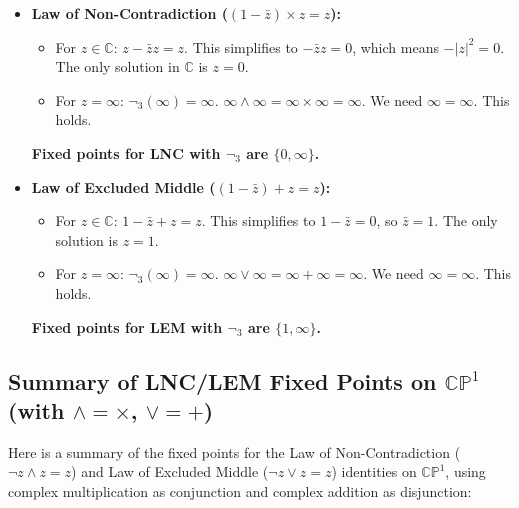 	\begin{itemize}
		\item \textbf{Law of Non-Contradiction ($(1 - \bar{z}) \times z = z$):}
		\begin{itemize}
			\item For $z \in \mathbb{C}$: $z - \bar{z}z = z$. This simplifies to $-\bar{z}z = 0$, which means $-|z|^2 = 0$. The only solution in $\mathbb{C}$ is $z = 0$.
			\item For $z = \infty$: $\neg_3(\infty) = \infty$. $\infty \wedge \infty = \infty \times \infty = \infty$. We need $\infty = \infty$. This holds.
		\end{itemize}
		\textbf{Fixed points for LNC with $\neg_3$ are $\{0, \infty\}$.}
		
		\item \textbf{Law of Excluded Middle ($(1 - \bar{z}) + z = z$):}
		\begin{itemize}
			\item For $z \in \mathbb{C}$: $1 - \bar{z} + z = z$. This simplifies to $1 - \bar{z} = 0$, so $\bar{z} = 1$. The only solution is $z = 1$.
			\item For $z = \infty$: $\neg_3(\infty) = \infty$. $\infty \vee \infty = \infty + \infty = \infty$. We need $\infty = \infty$. This holds.
		\end{itemize}
		\textbf{Fixed points for LEM with $\neg_3$ are $\{1, \infty\}$.}
	\end{itemize}
	
	\subsection{Summary of LNC/LEM Fixed Points on $\mathbb{CP}^1$ (with $\wedge=\times$, $\vee=+$)}
	
	Here is a summary of the fixed points for the Law of Non-Contradiction ($\neg z \wedge z = z$) and Law of Excluded Middle ($\neg z \vee z = z$) identities on $\mathbb{CP}^1$, using complex multiplication as conjunction and complex addition as disjunction:
	
